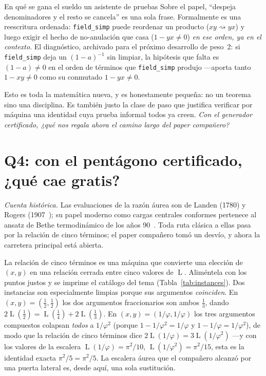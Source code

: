 \documentclass[11pt]{article}
\newcommand{\lean}[1]{\texttt{#1}}
\DeclareMathOperator{\Lrog}{L}
\begin{document}
\begin{recipebox}{En qu\'e se gana el sueldo un asistente de pruebas}
Sobre el papel, ``despeja denominadores y el resto se cancela'' es una sola frase.
Formalmente es una reescritura ordenada: \lean{field\_simp} puede reordenar un producto
($x y \rightsquigarrow y x$) y luego exigir el hecho de no-anulaci\'on que casa
($1-yx\neq0$) \emph{en ese orden, ya en el contexto}. El diagn\'ostico, archivado para el
pr\'oximo desarrollo de peso~2: si \lean{field\_simp} deja un $(1-a)^{-1}$ sin limpiar, la
hip\'otesis que falta es $(1-a)\neq0$ en el orden de t\'erminos que \lean{field\_simp}
produjo ---aporta tanto $1-xy\neq0$ como su conmutado $1-yx\neq0$.
\end{recipebox}

Esto es toda la matem\'atica nueva, y es honestamente peque\~na: no un teorema sino una
disciplina. Es tambi\'en justo la clase de paso que justifica verificar por m\'aquina una
identidad cuya prueba informal todos ya creen. \emph{Con el generador certificado, ¿qu\'e nos
regala ahora el camino largo del paper compa\~nero?}

\section{Q4: con el pent\'agono certificado, ¿qu\'e cae gratis?}\label{sec:corollaries}

\emph{Cuenta hist\'orica.} Las evaluaciones de la raz\'on \'aurea son de Landen (1780) y
Rogers (1907~\cite{rogers}); su papel moderno como cargas centrales conformes pertenece al
ansatz de Bethe termodin\'amico de los a\~nos 90~\cite{zamolodchikov,nahm,kirillov}. Toda
ruta cl\'asica a ellas pasa por la relaci\'on de cinco t\'erminos; el paper compa\~nero tom\'o
un desv\'io, y ahora la carretera principal est\'a abierta.

La relaci\'on de cinco t\'erminos es una m\'aquina que convierte una elecci\'on de $(x,y)$ en
una relaci\'on cerrada entre cinco valores de $\Lrog$. Alim\'entela con los puntos justos y se
imprime el cat\'alogo del tema (Tabla~\ref{tab:instances}). Dos instancias son especialmente
limpias porque sus argumentos \emph{coinciden}. En $(x,y)=(\tfrac12,\tfrac12)$ los dos
argumentos fraccionarios son ambos $\tfrac13$, dando
$2\Lrog(\tfrac12)=\Lrog(\tfrac14)+2\Lrog(\tfrac13)$. En $(x,y)=(1/\varphi,1/\varphi)$ los tres
argumentos compuestos colapsan \emph{todos} a $1/\varphi^2$ (porque $1-1/\varphi^2=1/\varphi$
y $1-1/\varphi=1/\varphi^2$), de modo que la relaci\'on de cinco t\'erminos dice
$2\Lrog(1/\varphi)=3\Lrog(1/\varphi^2)$ ---y con los valores de la escalera
$\Lrog(1/\varphi)=\pi^2/10$, $\Lrog(1/\varphi^2)=\pi^2/15$, esta es la identidad exacta
$\pi^2/5=\pi^2/5$. La escalera \'aurea que el compa\~nero alcanz\'o por una puerta lateral es,
desde aqu\'i, una sola sustituci\'on.
\end{document}
